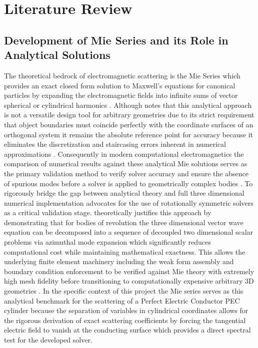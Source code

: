 \documentclass[class=report, crop=false]{standalone}
\begin{document}
\chapter{Literature Review}

\section{Development of Mie Series and its Role in Analytical Solutions}

The theoretical bedrock of electromagnetic scattering is the Mie Series which provides an exact closed form solution to Maxwell's equations for canonical particles by expanding the electromagnetic fields into infinite sums of vector spherical or cylindrical harmonics \citep{Martin1993}. Although \citet{Martin1993} notes that this analytical approach is not a versatile design tool for arbitrary geometries due to its strict requirement that object boundaries must coincide perfectly with the coordinate surfaces of an orthogonal system it remains the absolute reference point for accuracy because it eliminates the discretization and staircasing errors inherent in numerical approximations \citep{Wriedt2012}. Consequently in modern computational electromagnetics the comparison of numerical results against these analytical Mie solutions serves as the primary validation method to verify solver accuracy and ensure the absence of spurious modes before a solver is applied to geometrically complex bodies \citep{Paulsen1994}. To rigorously bridge the gap between analytical theory and full three dimensional numerical implementation \citet{Sjoberg2025} advocates for the use of rotationally symmetric solvers as a critical validation stage. \citet{Sjoberg2025} theoretically justifies this approach by demonstrating that for bodies of revolution the three dimensional vector wave equation can be decomposed into a sequence of decoupled two dimensional scalar problems via azimuthal mode expansion which significantly reduces computational cost while maintaining mathematical exactness. This allows the underlying finite element machinery including the weak form assembly and boundary condition enforcement to be verified against Mie theory with extremely high mesh fidelity before transitioning to computationally expensive arbitrary 3D geometries \citep{Sjoberg2025}. In the specific context of this project the Mie series serves as this analytical benchmark for the scattering of a Perfect Electric Conductor PEC cylinder because the separation of variables in cylindrical coordinates allows for the rigorous derivation of exact scattering coefficients by forcing the tangential electric field to vanish at the conducting surface which provides a direct spectral test for the developed solver.
\end{document}
